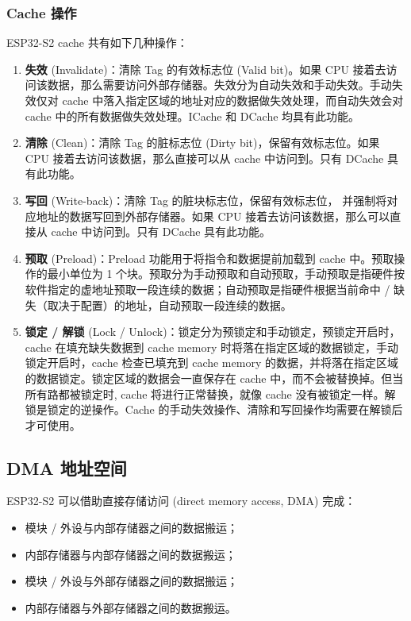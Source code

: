 \documentclass[main\_\_CN.tex]{subfiles}
\begin{document}
\subsubsection{Cache 操作}
ESP32-S2 cache 共有如下几种操作：
\begin{enumerate}
\item \textbf{失效} (Invalidate)：清除 Tag 的有效标志位 (Valid bit)。如果 CPU 接着去访问该数据，那么需要访问外部存储器。失效分为自动失效和手动失效。手动失效仅对 cache 中落入指定区域的地址对应的数据做失效处理，而自动失效会对 cache 中的所有数据做失效处理。ICache 和 DCache 均具有此功能。

\item \textbf{清除} (Clean)：清除 Tag 的脏标志位 (Dirty bit)，保留有效标志位。如果 CPU 接着去访问该数据，那么直接可以从 cache 中访问到。只有 DCache 具有此功能。

\item \textbf{写回} (Write-back)：清除 Tag 的脏块标志位，保留有效标志位， 并强制将对应地址的数据写回到外部存储器。如果 CPU 接着去访问该数据，那么可以直接从 cache 中访问到。只有 DCache 具有此功能。

\item \textbf{预取} (Preload)：Preload 功能用于将指令和数据提前加载到 cache 中。预取操作的最小单位为 1 个块。预取分为手动预取和自动预取，手动预取是指硬件按软件指定的虚地址预取一段连续的数据；自动预取是指硬件根据当前命中 / 缺失（取决于配置）的地址，自动预取一段连续的数据。

\item \textbf{锁定 / 解锁} (Lock / Unlock)：锁定分为预锁定和手动锁定，预锁定开启时，cache 在填充缺失数据到 cache memory 时将落在指定区域的数据锁定，手动锁定开启时，cache 检查已填充到 cache memory 的数据，并将落在指定区域的数据锁定。锁定区域的数据会一直保存在 cache 中，而不会被替换掉。但当所有路都被锁定时, cache 将进行正常替换，就像 cache 没有被锁定一样。解锁是锁定的逆操作。Cache 的手动失效操作、清除和写回操作均需要在解锁后才可使用。

\end{enumerate}



\subsection{ DMA 地址空间 }

ESP32-S2 可以借助直接存储访问 (direct memory access, DMA) 完成： \begin{itemize}
\item 模块 / 外设与内部存储器之间的数据搬运； \item 内部存储器与内部存储器之间的数据搬运；
\item 模块 / 外设与外部存储器之间的数据搬运；
\item 内部存储器与外部存储器之间的数据搬运。
\end{itemize}
\end{document}

